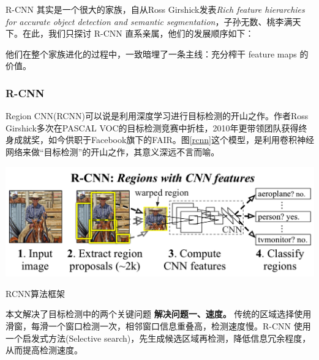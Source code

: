 R-CNN 其实是一个很大的家族，自从Ross Girshick发表\textit{Rich feature hierarchies for accurate object detection and semantic segmentation}\cite{rcnn}，子孙无数、桃李满天下。在此，我们只探讨 R-CNN 直系亲属，他们的发展顺序如下：

\vspace{10pt}


他们在整个家族进化的过程中，一致暗埋了一条主线：充分榨干 feature maps 的价值。

\subsubsection{R-CNN}
Region CNN(RCNN)\cite{rcnn}可以说是利用深度学习进行目标检测的开山之作。作者Ross Girshick多次在PASCAL VOC的目标检测竞赛中折桂，2010年更带领团队获得终身成就奖，如今供职于Facebook旗下的FAIR。图\ref{rcnn}这个模型，是利用卷积神经网络来做“目标检测”的开山之作，其意义深远不言而喻。
\begin{uscfigure}
	\includegraphics[width=\textwidth]{./Pictures/rcnn-regions_with_cnn_features.png}	
	\caption{RCNN算法框架}
	\label{rcnn}
\end{uscfigure}

本文解决了目标检测中的两个关键问题
\textbf{解决问题一、速度。}
传统的区域选择使用滑窗，每滑一个窗口检测一次，相邻窗口信息重叠高，检测速度慢。R-CNN 使用一个启发式方法(Selective search)，先生成候选区域再检测，降低信息冗余程度，从而提高检测速度。

